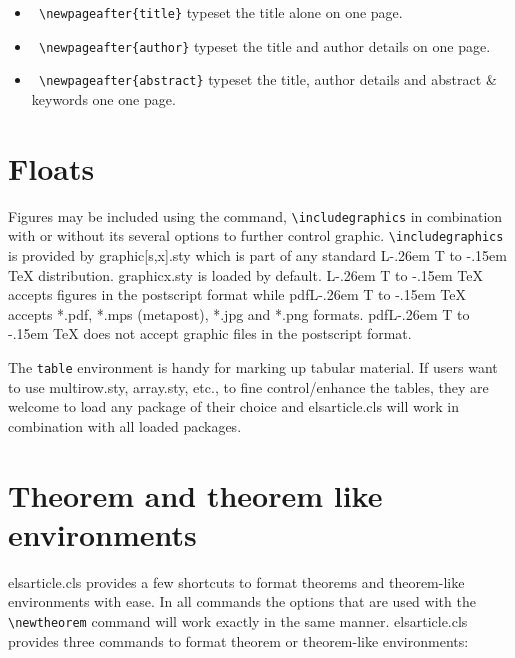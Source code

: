\documentclass[a4paper,12pt]{article}
\makeatletter
\def\file#1{\textsf{#1}\xspace}
\DeclareRobustCommand{\LaTeX}{L\kern-.26em%
        {\sbox\z@ T%
         \vbox to\ht\z@{\hbox{\check@mathfonts
           \fontsize\sf@size\z@
           \math@fontsfalse\selectfont
          A\,}%
         \vss}%
        }%
     \kern-.15em%
    \TeX}
\makeatother
\begin{document}
\begin{vquote}
\end{vquote}


\begin{itemize}
\leftskip-2pc
\item [] {\tt\color{verbcolor} \verb+\newpageafter{title}+} typeset the title alone on one page.

\item [] {\tt\color{verbcolor} \verb+\newpageafter{author}+}  typeset the title
and author details on one page.

\item [] {\tt\color{verbcolor} \verb+\newpageafter{abstract}+}
typeset the title,
author details and abstract \& keywords one one page.

\end{itemize}


\section{Floats}
{Figures} may be included using the command, \verb+\includegraphics+ in
combination with or without its several options to further control
graphic. \verb+\includegraphics+ is provided by \file{graphic[s,x].sty}
which is part of any standard \LaTeX{} distribution.
\file{graphicx.sty} is loaded by default. \LaTeX{} accepts figures in
the postscript format while pdf\LaTeX{} accepts \file{*.pdf},
\file{*.mps} (metapost), \file{*.jpg} and \file{*.png} formats. 
pdf\LaTeX{} does not accept graphic files in the postscript format. 

The \verb+table+ environment is handy for marking up tabular
material. If users want to use \file{multirow.sty},
\file{array.sty}, etc., to fine control/enhance the tables, they
are welcome to load any package of their choice and
\file{elsarticle.cls} will work in combination with all loaded
packages.

\section[Theorem and ...]{Theorem and theorem like environments}

\file{elsarticle.cls} provides a few shortcuts to format theorems and
theorem-like environments with ease. In all commands the options that
are used with the \verb+\newtheorem+ command will work exactly in the same
manner. \file{elsarticle.cls} provides three commands to format theorem or
theorem-like environments: 
\end{document}
